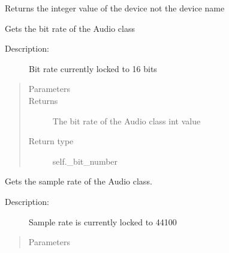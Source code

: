 \documentclass[letterpaper,10pt,english]{sphinxmanual}
\begin{document}
\begin{fulllineitems}
\begin{fulllineitems}
\sphinxAtStartPar
Returns the integer value of the device not the device name

\end{fulllineitems}


\begin{fulllineitems}
\label{\detokenize{dpav:dpav.audio.Audio.get_bit_number}}
\sphinxAtStartPar
Gets the bit rate of the Audio class
\begin{description}
\item[{Description:}] \leavevmode
\sphinxAtStartPar
Bit rate currently locked to 16 bits

\end{description}
\begin{quote}\begin{description}
\item[{Parameters}] \leavevmode
\sphinxAtStartPar
{} \textendash{} 

\item[{Returns}] \leavevmode
\sphinxAtStartPar
The bit rate of the Audio class \sphinxhyphen{} int value

\item[{Return type}] \leavevmode
\sphinxAtStartPar
self.\_bit\_number

\end{description}\end{quote}

\end{fulllineitems}


\begin{fulllineitems}
\label{\detokenize{dpav:dpav.audio.Audio.get_sample_rate}}
\sphinxAtStartPar
Gets the sample rate of the Audio class.
\begin{description}
\item[{Description:}] \leavevmode
\sphinxAtStartPar
Sample rate is currently locked to 44100

\end{description}
\begin{quote}\begin{description}
\item[{Parameters}] \leavevmode
\sphinxAtStartPar
{} \textendash{} 


\end{description}
\end{quote}
\end{fulllineitems}
\end{fulllineitems}
\end{document}
